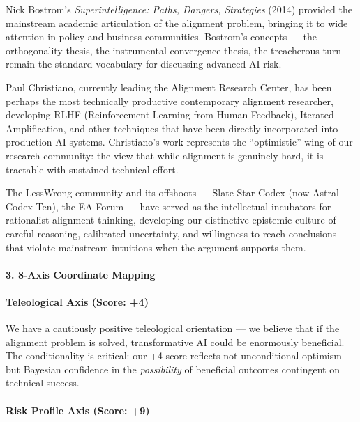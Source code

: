 Nick Bostrom's \emph{Superintelligence: Paths, Dangers, Strategies}
(2014) provided the mainstream academic articulation of the alignment
problem, bringing it to wide attention in policy and business
communities. Bostrom's concepts --- the orthogonality thesis, the
instrumental convergence thesis, the treacherous turn --- remain the
standard vocabulary for discussing advanced AI risk.

Paul Christiano, currently leading the Alignment Research Center, has
been perhaps the most technically productive contemporary alignment
researcher, developing RLHF (Reinforcement Learning from Human
Feedback), Iterated Amplification, and other techniques that have been
directly incorporated into production AI systems. Christiano's work
represents the ``optimistic'' wing of our research community: the view
that while alignment is genuinely hard, it is tractable with sustained
technical effort.

The LessWrong community and its offshoots --- Slate Star Codex (now
Astral Codex Ten), the EA Forum --- have served as the intellectual
incubators for rationalist alignment thinking, developing our
distinctive epistemic culture of careful reasoning, calibrated
uncertainty, and willingness to reach conclusions that violate
mainstream intuitions when the argument supports them.

\paragraph{3. 8-Axis Coordinate
Mapping}\label{axis-coordinate-mapping-3}

\paragraph{Teleological Axis (Score:
+4)}\label{teleological-axis-score-4}

We have a cautiously positive teleological orientation --- we believe
that if the alignment problem is solved, transformative AI could be
enormously beneficial. The conditionality is critical: our +4 score
reflects not unconditional optimism but Bayesian confidence in the
\emph{possibility} of beneficial outcomes contingent on technical
success.

\paragraph{Risk Profile Axis (Score:
+9)}\label{risk-profile-axis-score-9}

